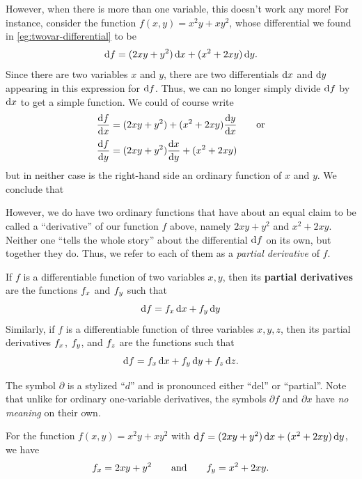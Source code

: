 \documentclass[12pt]{amsart}
\begin{document}
However, when there is more than one variable, this doesn't work any more!
For instance, consider the function $f(x,y) = x^2y + xy^2$, whose differential we found in \cref{eg:twovar-differential} to be
\[ {\mathrm{d} f} = (2xy + y^2)\,{\mathrm{d} x} + (x^2+2xy)\,{\mathrm{d} y}.\]
Since there are two variables $x$ and $y$, there are two differentials ${\mathrm{d} x}$ and ${\mathrm{d} y}$ appearing in this expression for ${\mathrm{d} f}$.
Thus, we can no longer simply divide ${\mathrm{d} f}$ by ${\mathrm{d} x}$ to get a simple function.
We could of course write
\begin{align*}
  \frac{{\mathrm{d} f}}{{\mathrm{d} x}} &= (2xy + y^2) + (x^2+2xy)\frac{{\mathrm{d} y}}{{\mathrm{d} x}} \qquad\text{or}\\[2pt]
  \frac{{\mathrm{d} f}}{{\mathrm{d} y}} &= (2xy + y^2)\frac{{\mathrm{d} x}}{{\mathrm{d} y}} + (x^2+2xy)
\end{align*}
but in neither case is the right-hand side an ordinary function of $x$ and $y$.
We conclude that\\
\begin{center}
\end{center}
\vspace{5mm}
However, we do have two ordinary functions that have about an equal claim to be called a ``derivative'' of our function $f$ above, namely $2xy + y^2$ and $x^2+2xy$.
Neither one ``tells the whole story'' about the differential ${\mathrm{d} f}$ on its own, but together they do.
Thus, we refer to each of them as a \emph{partial derivative} of $f$.

\begin{defn}
  If $f$ is a differentiable function of two variables $x,y$, then its \textbf{partial derivatives} are the functions ${f}_{x}$ and ${f}_{y}$ such that
  \[ {\mathrm{d} f} = {f}_{x}\,{\mathrm{d} x} + {f}_{y}\,{\mathrm{d} y}\]
  Similarly, if $f$ is a differentiable function of three variables $x,y,z$, then its partial derivatives ${f}_{x}$, ${f}_{y}$, and ${f}_{z}$ are the functions such that
  \[ {\mathrm{d} f} = {f}_{x}\,{\mathrm{d} x} + {f}_{y}\,{\mathrm{d} y} + {f}_{z}\,{\mathrm{d} z}.\]
\end{defn}

The symbol $\partial$ is a stylized ``$d$'' and is pronounced either ``del'' or ``partial''.
Note that unlike for ordinary one-variable derivatives, the symbols $\partial f$ and $\partial x$ have \emph{no meaning} on their own.

\begin{eg}
  For the function $f(x,y) = x^2y + xy^2$ with ${\mathrm{d} f} = (2xy + y^2)\,{\mathrm{d} x} + (x^2+2xy)\,{\mathrm{d} y}$, we have
  \begin{align*}
    {f}_{x} = 2xy + y^2 \qquad\text{and}\qquad
    {f}_{y} = x^2+2xy.
  \end{align*}
\end{eg}
\end{document}
